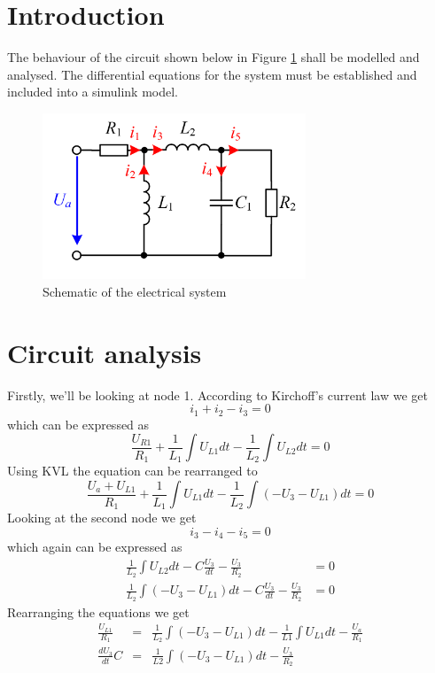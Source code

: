 \section{Introduction}

The behaviour of the circuit shown below in Figure \ref{fig:shematic} shall be modelled and analysed. The differential equations for the system must be established and included into a simulink model.

\begin{figure}[H]
		\centering
		\includegraphics[width=0.7\textwidth]{figures/shematic.png}
		\caption{Schematic of the electrical system}
		\label{fig:shematic}
\end{figure}

\section{Circuit analysis}
Firstly, we'll be looking at node 1. According to Kirchoff's current law we get
\begin{equation} 
i_1+i_2-i_3=0
\end{equation}
which can be expressed as
\begin{equation}
\frac{U_{R1}}{R_1}+\frac{1}{L_1}\int U_{L1} dt -\frac{1}{L_2}\int U_{L2} dt=0
\end{equation}
Using KVL the equation can be rearranged to
\begin{equation}
\frac{U_a+U_{L1}}{R_1}+\frac{1}{L_1}\int U_{L1} dt-\frac{1}{L_2}\int (-U_3-U_{L1})dt=0
\end{equation}
Looking at the second node we get
\begin{equation}
i_3-i_4-i_5=0
\end{equation}
which again can be expressed as
\begin{eqnarray}
\frac{1}{L_2}\int U_{L2} dt-C\frac{U_3}{dt}-\frac{U_3}{R_2}&=0 \\
\frac{1}{L_2}\int (-U_3-U_{L1})dt-C\frac{U_3}{dt}-\frac{U_3}{R_2}&=0 
\end{eqnarray}
Rearranging the equations we get
\begin{eqnarray}
\frac{U_{L1}}{R_1}&=&\frac{1}{L_2}\int (-U_3-U_{L1})dt-\frac{1}{L1}\int U_{L1}dt-\frac{U_a}{R_1} \label{eq:a} \\
\frac{dU_3}{dt}C&=&\frac{1}{L2}\int(-U_3-U_{L1}) dt-\frac{U_3}{R_2}\label{eq:b} 
\end{eqnarray}


